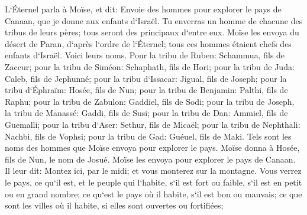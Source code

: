 \verse L`Éternel parla à Moïse, et dit: 
\verse Envoie des hommes pour explorer le pays de Canaan, que je donne aux enfants d`Israël. Tu enverras un homme de chacune des tribus de leurs pères; tous seront des principaux d`entre eux. 
\verse Moïse les envoya du désert de Paran, d`après l`ordre de l`Éternel; tous ces hommes étaient chefs des enfants d`Israël. 
\verse Voici leurs noms. Pour la tribu de Ruben: Schammua, fils de Zaccur; 
\verse pour la tribu de Siméon: Schaphath, fils de Hori; 
\verse pour la tribu de Juda: Caleb, fils de Jephunné; 
\verse pour la tribu d`Issacar: Jigual, fils de Joseph; 
\verse pour la tribu d`Éphraïm: Hosée, fils de Nun; 
\verse pour la tribu de Benjamin: Palthi, fils de Raphu; 
\verse pour la tribu de Zabulon: Gaddiel, fils de Sodi; 
\verse pour la tribu de Joseph, la tribu de Manassé: Gaddi, fils de Susi; 
\verse pour la tribu de Dan: Ammiel, fils de Guemalli; 
\verse pour la tribu d`Aser: Sethur, fils de Micaël; 
\verse pour la tribu de Nephthali: Nachbi, fils de Vophsi; 
\verse pour la tribu de Gad: Guéuel, fils de Maki. 
\verse Tels sont les noms des hommes que Moïse envoya pour explorer le pays. Moïse donna à Hosée, fils de Nun, le nom de Josué. 
\verse Moïse les envoya pour explorer le pays de Canaan. Il leur dit: Montez ici, par le midi; et vous monterez sur la montagne. 
\verse Vous verrez le pays, ce qu`il est, et le peuple qui l`habite, s`il est fort ou faible, s`il est en petit ou en grand nombre; 
\verse ce qu`est le pays où il habite, s`il est bon ou mauvais; ce que sont les villes où il habite, si elles sont ouvertes ou fortifiées; 
